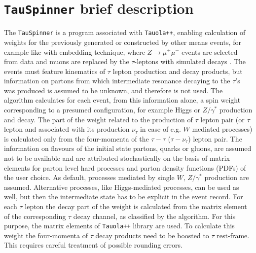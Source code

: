 \documentclass{article}
\begin{document}
\section{{\tt TauSpinner} brief description}\label{Sec:tauspinner}

The {\tt TauSpinner} is a program associated with {\tt Tauola++}, enabling calculation of weights for the previously 
generated or constructed by other means events, for example like with embedding technique,
where  $Z \to \mu^+\mu^-$ events are selected from data and 
muons are replaced by the $\tau$-leptons  with simulated decays \cite{embedding-atlas}. 
The events must  feature kinematics of  $\tau$ lepton production and decay products, but 
information on partons from which intermediate resonance decaying to  the $\tau$'s  was produced is 
assumed to be  unknown, and therefore is not used.
The algorithm calculates for each event,  from  this information alone,  a spin weight
 corresponding to a presumed  configuration, for example Higgs or $Z/\gamma^{*}$ production and decay.   
The part of the weight related to the production 
of $\tau$ lepton pair (or $\tau$ lepton and associated with its production  $\nu_\tau$ in case 
of e.g. $W$ mediated processes) is calculated only from the four-momenta of the  $\tau-\tau$ 
($\tau-\nu_\tau$) lepton pair. The information on flavours of the initial state partons,
quarks or gluons,  are assumed not to be available and are attributed stochastically on the
basis of matrix elements for parton level hard processes and parton density functions (PDFs) of the user choice.
As default, processes mediated by  single $W$, $Z/\gamma^{*}$ production are assumed. Alternative processes, like
Higgs-mediated processes, can be used as well, but then the intermediate state has to be explicit in the event record.
For each $\tau$ lepton the decay part of the weight is calculated from the matrix element 
of the corresponding $\tau$ decay channel, as classified by the algorithm. For this purpose, the matrix elements
of {\tt Tauola++} library \cite{Davidson:2010rw} are used. To calculate this weight the four-momenta of $\tau$ 
decay products need to be boosted to $\tau$ rest-frame. This requires careful treatment of possible rounding errors.
\end{document}
